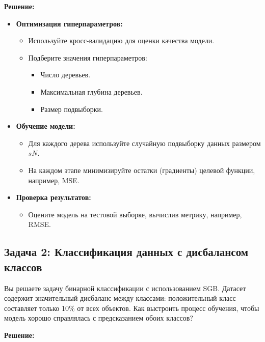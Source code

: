 \textbf{Решение:}

\begin{itemize}
    \item \textbf{Оптимизация гиперпараметров:}
          \begin{itemize}
              \item Используйте кросс-валидацию для оценки качества модели.
              \item Подберите значения гиперпараметров:
                    \begin{itemize}
                        \item Число деревьев.
                        \item Максимальная глубина деревьев.
                        \item Размер подвыборки.
                    \end{itemize}
          \end{itemize}
    \item \textbf{Обучение модели:}
          \begin{itemize}
              \item Для каждого дерева используйте случайную подвыборку данных размером $sN$.
              \item На каждом этапе минимизируйте остатки (градиенты) целевой функции, например, MSE.
          \end{itemize}
    \item \textbf{Проверка результатов:}
          \begin{itemize}
              \item Оцените модель на тестовой выборке, вычислив метрику, например, RMSE.
          \end{itemize}
\end{itemize}

\subsection{Задача 2: Классификация данных с дисбалансом классов}

Вы решаете задачу бинарной классификации с использованием SGB. Датасет содержит значительный дисбаланс между классами: положительный класс составляет только 10\% от всех объектов. Как выстроить процесс обучения, чтобы модель хорошо справлялась с предсказанием обоих классов?

\textbf{Решение:}

